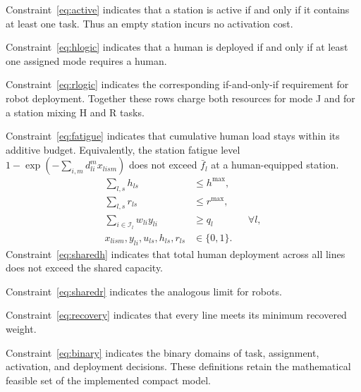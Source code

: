 Constraint~\eqref{eq:active} indicates that a station is active if and only if it contains at least one task. Thus an empty station incurs no activation cost.

Constraint~\eqref{eq:hlogic} indicates that a human is deployed if and only if at least one assigned mode requires a human.

Constraint~\eqref{eq:rlogic} indicates the corresponding if-and-only-if requirement for robot deployment. Together these rows charge both resources for mode J and for a station mixing H and R tasks.

Constraint~\eqref{eq:fatigue} indicates that cumulative human load stays within its additive budget. Equivalently, the station fatigue level $1-\exp(-\sum_{i,m}d_{li}^{m}x_{lism})$ does not exceed $\bar f_l$ at a human-equipped station.
\begin{align}
\sum_{l,s}h_{ls}&\leq h^{\max},\label{eq:sharedh}\\
\sum_{l,s}r_{ls}&\leq r^{\max},\label{eq:sharedr}\\
\sum_{i\in\mathcal I_l}w_{li}y_{li}&\geq q_l&&\forall l,\label{eq:recovery}\\
x_{lism},y_{li},u_{ls},h_{ls},r_{ls}&\in\{0,1\}.\label{eq:binary}
\end{align}
Constraint~\eqref{eq:sharedh} indicates that total human deployment across all lines does not exceed the shared capacity.

Constraint~\eqref{eq:sharedr} indicates the analogous limit for robots.

Constraint~\eqref{eq:recovery} indicates that every line meets its minimum recovered weight.

Constraint~\eqref{eq:binary} indicates the binary domains of task, assignment, activation, and deployment decisions. These definitions retain the mathematical feasible set of the implemented compact model.
